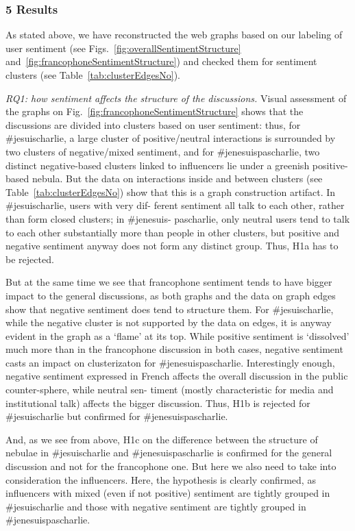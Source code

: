 \subsubsection{5 Results} As stated above, we have reconstructed the web graphs based on our labeling of user sentiment (see Figs.~\cref{fig:overallSentimentStructure} and~\cref{fig:francophoneSentimentStructure}) and checked them for sentiment clusters (see Table~\cref{tab:clusterEdgesNo}).

\textit{RQ1: how sentiment affects the structure of the discussions.} Visual assessment of the graphs on Fig.~\cref{fig:francophoneSentimentStructure} shows that the discussions are divided into clusters based on user sentiment: thus, for \#jesuischarlie, a large cluster of positive/neutral interactions is surrounded by two clusters of negative/mixed sentiment, and for \#jenesuispascharlie, two distinct negative-based clusters linked to influencers lie under a greenish positive-based nebula. But the data on interactions inside and between clusters (see Table~\cref{tab:clusterEdgesNo}) show that this is a graph construction artifact. In \#jesuischarlie, users with very dif- ferent sentiment all talk to each other, rather than form closed clusters; in \#jenesuis- pascharlie, only neutral users tend to talk to each other substantially more than people in other clusters, but positive and negative sentiment anyway does not form any distinct group. Thus, H1a has to be rejected.

But at the same time we see that francophone sentiment tends to have bigger impact to the general discussions, as both graphs and the data on graph edges show that negative sentiment does tend to structure them. For \#jesuischarlie, while the negative cluster is not supported by the data on edges, it is anyway evident in the graph as a ‘flame’ at its top. While positive sentiment is ‘dissolved’ much more than in the francophone discussion in both cases, negative sentiment casts an impact on clusterizaton for \#jenesuispascharlie. Interestingly enough, negative sentiment expressed in French affects the overall discussion in the public counter-sphere, while neutral sen- timent (mostly characteristic for media and institutional talk) affects the bigger discussion. Thus, H1b is rejected for \#jesuischarlie but confirmed for \#jenesuispascharlie.

And, as we see from above, H1c on the difference between the structure of nebulae in \#jesuischarlie and \#jenesuispascharlie is confirmed for the general discussion and not for the francophone one. But here we also need to take into consideration the influencers. Here, the hypothesis is clearly confirmed, as influencers with mixed (even if not positive) sentiment are tightly grouped in \#jesuischarlie and those with negative sentiment are tightly grouped in \#jenesuispascharlie.

